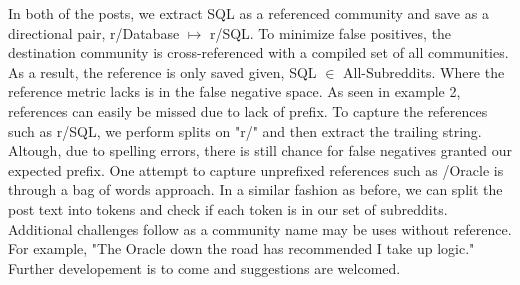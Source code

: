 \documentclass[b0paper,margin=1cm,landscape]{baposter}
\begin{document}
\begin{poster}
{  \hspace{5mm} In both of the posts, we extract SQL as a referenced community and save as a directional pair, r/Database $ \longmapsto $ r/SQL.
  To minimize false positives, the destination community is cross-referenced with a compiled set of all communities. 
  As a result, the reference is only saved given, SQL $ \in $ All-Subreddits.
  Where the reference metric lacks is in the false negative space. 
  As seen in example 2, references can easily be missed due to lack of prefix.
  To capture the references such as r/SQL, we perform splits on "r/" and then extract the trailing string.
  Altough, due to spelling errors, there is still chance for false negatives granted our expected prefix.
  One attempt to capture unprefixed references such as /Oracle is through a bag of words approach. 
  In a similar fashion as before, we can split the post text into tokens and check if each token is in our set of subreddits.
  Additional challenges follow as a community name may be uses without reference. For example, "The Oracle down the road has recommended I take up logic."
  Further developement is to come and suggestions are welcomed. 

}

\end{poster}
\end{document}
